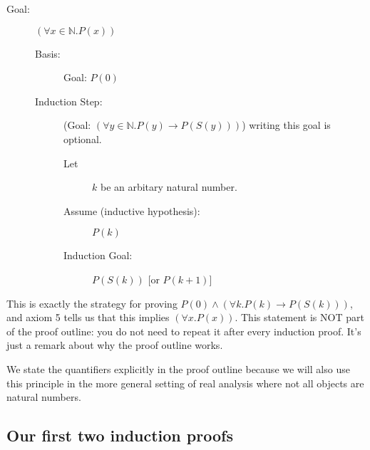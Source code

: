 \documentclass[12pt]{article}
\begin{document}
\begin{description}

\item[Goal:]  $(\forall x \in {\mathbb N}.P(x))$

\begin{description}

\item[Basis:]  Goal:  $P(0)$

\item[Induction Step:]  (Goal:  $(\forall y\in \mathbb N.P(y) \rightarrow P(S(y)))$) writing this goal is optional.

\begin{description}

\item[Let]  $k$ be an arbitary natural number.

\item[Assume (inductive hypothesis):]  $P(k)$

\item[Induction Goal:]  $P(S(k))$ [or $P(k+1)$]

\end{description}

\end{description}

\end{description}

This is exactly the strategy for proving $P(0) \wedge (\forall k.P(k)
\rightarrow P(S(k)))$, and axiom 5 tells us that this implies $(\forall
x.P(x))$.  This statement is NOT part of the proof outline: you do not
need to repeat it after every induction proof.  It's just a remark
about why the proof outline works.

We state the quantifiers explicitly in the proof outline because we
will also use this principle in the more general setting of real
analysis where not all objects are natural numbers.

\subsection{Our first two induction proofs}
\end{document}
